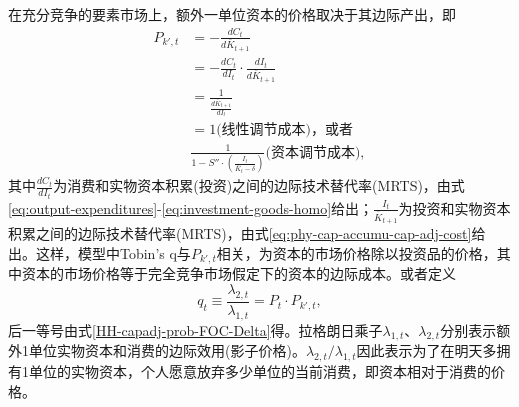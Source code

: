 \begin{subappendices}
在充分竞争的要素市场上，额外一单位资本的价格取决于其边际产出，即
\begin{equation}
\begin{split}
P_{k',t} &= - \frac{d C_t}{d \bar{K}_{t+1}} \nonumber \\
&=  - \frac{d C_t}{d I_t} \cdot \frac{d I_t}{d \bar{K}_{t+1}} \nonumber \\
&=\frac{1}{\frac{d \bar{ K}_{t+1}}{d I_t}} \nonumber \\
&=1\text{(线性调节成本)，或者} \nonumber \\
&\frac{1}{1-S''\cdot\left(\frac{I_t}{\bar{K}_{t} - \delta}\right)}\text{(资本调节成本)},
\end{split}
\end{equation}
其中$\frac{d C_t}{d I_t}$为消费和实物资本积累(投资)之间的边际技术替代率(MRTS)，由式\eqref{eq:output-expenditures}-\eqref{eq:investment-goods-homo}给出；$\frac{I_t}{\bar{K}_{t+1}}$为投资和实物资本积累之间的边际技术替代率(MRTS)，由式\eqref{eq:phy-cap-accumu-cap-adj-cost}给出。这样，模型中Tobin's q与$P_{k',t}$相关，为资本的市场价格除以投资品的价格，其中资本的市场价格等于完全竞争市场假定下的资本的边际成本。或者定义
\begin{equation}
\label{eq:tobin-q-sims-2015}
q_t \equiv \frac{\lambda_{2,t}}{\lambda_{1,t}} = P_t \cdot P_{k',t},
\end{equation}
后一等号由式\eqref{HH-capadj-prob-FOC-Delta}得。拉格朗日乘子$\lambda_{1,t}$、$\lambda_{2,t}$分别表示额外1单位实物资本和消费的边际效用(影子价格)。$\lambda_{2,t}/\lambda_{1,t}$因此表示为了在明天多拥有1单位的实物资本，个人愿意放弃多少单位的当前消费，即资本相对于消费的价格。


\end{subappendices}
